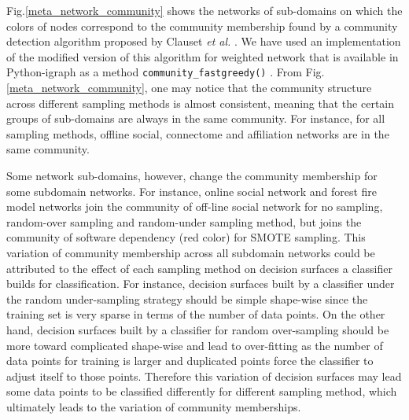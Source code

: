 \documentclass{article}
\begin{document}
Fig.\ref{meta_network_community} shows the networks of sub-domains on which the colors of nodes correspond to the community membership found by a community detection algorithm proposed by Clauset \textit{et al.} \cite{CNMAlgorithm}. We have used an implementation of the modified version of this algorithm for weighted network that is available in Python-igraph as a method \texttt{community\_fastgreedy()} \cite{igraph}. From Fig.\ref{meta_network_community}, one may notice that the community structure across different sampling methods is almost consistent, meaning that the certain groups of sub-domains are always in the same community.  For instance, for all sampling methods, offline social, connectome and affiliation networks are in the same community. 

Some network sub-domains, however, change the community membership for some subdomain networks. For instance, online social network and forest fire model networks join the community of off-line social network for no sampling, random-over sampling and random-under sampling method, but joins the community of software dependency (red color) for SMOTE sampling. This variation of community membership across all subdomain networks could be attributed to the effect of each sampling method on decision surfaces a classifier builds for classification. For instance, decision surfaces built by a classifier under the random under-sampling strategy should be simple shape-wise since the training set is very sparse in terms of the number of data points. On the other hand, decision surfaces built by a classifier for random over-sampling should be more toward complicated shape-wise and lead to over-fitting as the number of data points for training is larger and duplicated points force the classifier to adjust itself to those points. Therefore this variation of decision surfaces may lead some data points to be classified differently for different sampling method, which ultimately leads to the variation of community memberships.
\end{document}
